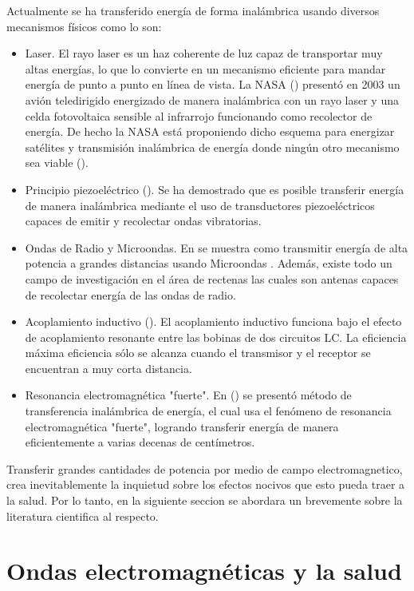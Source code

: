 \documentclass{intech}
\begin{document}
Actualmente se ha transferido energ{\'i}a de forma inal\'ambrica usando diversos mecanismos f{\'i}sicos como lo son: 

\begin{itemize}
\item Laser. El rayo laser es un haz coherente de luz capaz de transportar muy altas energ{\'i}as, lo que lo convierte en un mecanismo eficiente para mandar energ{\'i}a de punto a punto en l{\'i}nea de vista. La NASA (\cite{RES21}) present\'o en 2003 un avi\'on teledirigido energizado de manera inal\'ambrica con un rayo laser y una celda fotovoltaica sensible al infrarrojo funcionando como recolector de energ{\'i}a. De hecho la NASA est\'a proponiendo dicho esquema para energizar sat\'elites y transmisi\'on inal\'ambrica de energ{\'i}a donde ning\'un otro mecanismo sea viable (\cite{RES21}).
\item Principio piezoel\'ectrico (\cite{RES8}). Se ha demostrado que es posible transferir energ{\'i}a de manera inal\'ambrica mediante el uso de transductores piezoel\'ectricos capaces de emitir y recolectar ondas vibratorias.
\item Ondas de Radio y Microondas. En \cite{RES22} se muestra como transmitir energ{\'i}a de alta potencia a grandes distancias usando Microondas . Adem\'as, existe todo un campo de investigaci\'on en el \'area de rectenas \cite{RES4,RES9,RES10,RES12} las cuales son antenas capaces de recolectar energ{\'i}a de las ondas de radio.
\item Acoplamiento inductivo (\cite{RES3,RES5,RES6,RES7}). El acoplamiento inductivo funciona bajo el efecto de acoplamiento resonante entre las bobinas de dos circuitos LC. La eficiencia m\'axima eficiencia s\'olo se alcanza cuando el transmisor y el receptor se encuentran a muy corta distancia.
\item Resonancia electromagn\'etica "fuerte". En (\cite{RES1,RES2}) se present\'o m\'etodo de transferencia inal\'ambrica de energ{\'i}a, el cual usa el fen\'omeno de resonancia electromagn\'etica "fuerte", logrando transferir energ{\'i}a de manera eficientemente a varias decenas de cent{\'i}metros.
\end{itemize}

Transferir grandes cantidades de potencia por medio de campo electromagnetico, crea inevitablemente la inquietud
sobre los efectos nocivos que esto pueda traer a la salud. Por lo tanto, en la siguiente seccion se abordara
un brevemente sobre la literatura cientifica al respecto.


\section{Ondas electromagn\'eticas y la salud}
\end{document}
